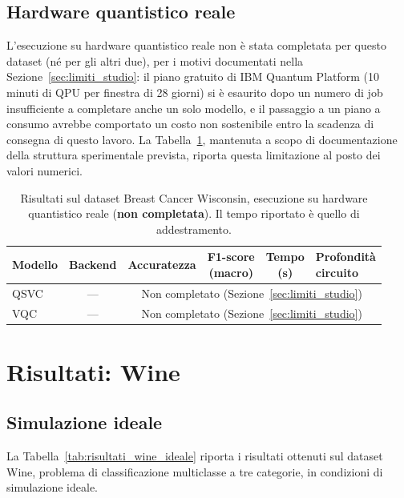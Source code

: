 \subsection{Hardware quantistico reale}
L'esecuzione su hardware quantistico reale non è stata completata per questo dataset (né per gli altri due), per i motivi documentati nella Sezione~\ref{sec:limiti_studio}: il piano gratuito di IBM Quantum Platform (10 minuti di QPU per finestra di 28 giorni) si è esaurito dopo un numero di job insufficiente a completare anche un solo modello, e il passaggio a un piano a consumo avrebbe comportato un costo non sostenibile entro la scadenza di consegna di questo lavoro. La Tabella~\ref{tab:risultati_breast_cancer_hardware}, mantenuta a scopo di documentazione della struttura sperimentale prevista, riporta questa limitazione al posto dei valori numerici.

\begin{table}[htbp]
\centering
\caption{Risultati sul dataset Breast Cancer Wisconsin, esecuzione su hardware quantistico reale (\textbf{non completata}). Il tempo riportato è quello di addestramento.}
\label{tab:risultati_breast_cancer_hardware}
{\renewcommand{\arraystretch}{1.5} %
\footnotesize
\begin{tabular}{>{\raggedright\arraybackslash}p{2.2cm}cccc>{\raggedright\arraybackslash}p{2cm}}
\toprule
\textbf{Modello} & \textbf{Backend} & \textbf{Accuratezza} & \thead{\textbf{F1-score}\\\textbf{(macro)}} & \thead{\textbf{Tempo}\\\textbf{(s)}} & \thead{\textbf{Profondità}\\\textbf{circuito}} \\
\midrule
QSVC & --- & \multicolumn{4}{c}{Non completato (Sezione~\ref{sec:limiti_studio})} \\
VQC & --- & \multicolumn{4}{c}{Non completato (Sezione~\ref{sec:limiti_studio})} \\
\bottomrule
\end{tabular}
}
\end{table}

\section{Risultati: Wine}
\label{sec:risultati_wine}

\subsection{Simulazione ideale}
La Tabella~\ref{tab:risultati_wine_ideale} riporta i risultati ottenuti sul dataset Wine, problema di classificazione multiclasse a tre categorie, in condizioni di simulazione ideale.

